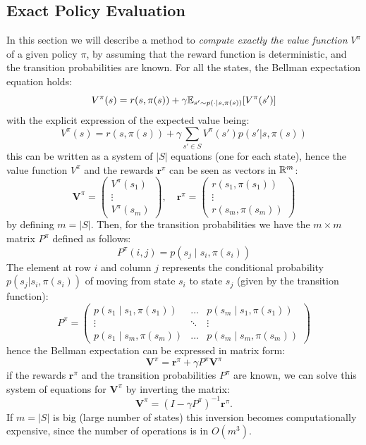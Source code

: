 \documentclass[10pt, a4paper]{report}
\begin{document}
\subsection{Exact Policy Evaluation}
In this section we will describe a method to \textit{compute exactly the value function} $V^\pi$ of a given policy $\pi$, by assuming that the reward function is deterministic, and the transition probabilities are known.
For all the states, the Bellman expectation equation holds:\begin{equation}
    V^\pi(s)=r(s,\pi(s))+\gamma{\mathbb E}_{s'\sim p(\cdot\mid s,\pi(s))}[V^\pi(s')]
\end{equation}
with the explicit expression of the expected value being:
\begin{equation}
    V^\pi(s)=
    r(s,\pi(s))+\gamma\sum_{s'\in S}V^\pi(s')p(s'|s,\pi(s))
\end{equation}
this can be written as a system of $|S|$ equations (one for each state), hence the value function $V^\pi$ and the rewards $\mathbf r^\pi$ can be seen as vectors in ${\mathbb R}^m$:\begin{equation}
    \mathbf V^\pi=\begin{pmatrix}
        V^\pi(s_1)\\\vdots\\ V^\pi(s_m)
    \end{pmatrix},\quad 
    \mathbf r^\pi=\begin{pmatrix}
       r(s_1,\pi(s_1))\\\vdots\\ r(s_m,\pi(s_m))
    \end{pmatrix}
\end{equation}
by defining $m=|S|$. Then, for the transition probabilities we have the $m\times m$ matrix $P^\pi$ defined as follows:\begin{equation}
    P^\pi(i,j)=p(s_j\mid s_i,\pi(s_i))
\end{equation} 
The element at row $i$ and column $j$ represents the conditional probability $p(s_j \vert{} s_i, \pi(s_i))$ of moving from state $s_i$ to state $s_j$ (given by the transition function):
\begin{equation}
     P^\pi=\begin{pmatrix}
        p(s_1\mid s_1,\pi(s_1))&\dots&p(s_m\mid s_1,\pi(s_1))\\
         \vdots&\ddots&\vdots\\
         p(s_1\mid s_m,\pi(s_m))&\dots&p(s_m\mid s_m,\pi(s_m))
     \end{pmatrix}
\end{equation}
hence the Bellman expectation can be expressed in matrix form:\begin{equation}
    \mathbf V^\pi=\mathbf r^\pi+\gamma P^\pi \mathbf V^\pi
\end{equation}
if the rewards $\mathbf r^\pi$ and the transition probabilities $P^\pi$ are known, we can solve this system of equations for $\mathbf V^\pi$ by inverting the matrix:\begin{equation}
     \mathbf V^\pi=(I-\gamma P^\pi)^{-1}\mathbf r^\pi. 
\end{equation}
If $m=|S|$ is big (large number of states) this inversion becomes computationally expensive, since the number of operations is in $O(m^3)$.
\end{document}
